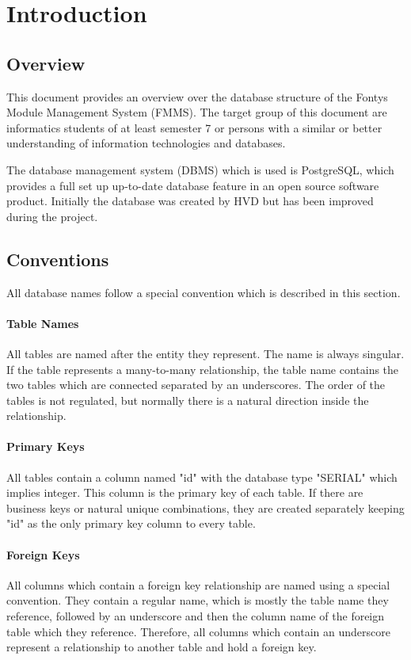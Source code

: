 \section{Introduction}
\label{sec:intro}


\subsection{Overview}

This document provides an overview over the database structure of the Fontys Module Management System (FMMS).
The target group of this document are informatics students of at least semester 7 or persons with a similar or better understanding of information technologies and databases.

The database management system (DBMS) which is used is PostgreSQL, which provides a full set up up-to-date database feature in an open source software product.
Initially the database was created by HVD but has been improved during the project.


\subsection{Conventions}

All database names follow a special convention which is described in this section.


\paragraph{Table Names}
All tables are named after the entity they represent. The name is always singular. If the table represents a many-to-many relationship, the table name contains the two tables which are connected separated by an underscores. The order of the tables is not regulated, but normally there is a natural direction inside the relationship.

\paragraph{Primary Keys}
All tables contain a column named "id" with the database type "SERIAL" which implies integer. This column is the primary key of each table. If there are business keys or natural unique combinations, they are created separately keeping "id" as the only primary key column to every table.

\paragraph{Foreign Keys}
All columns which contain a foreign key relationship are named using a special convention. They contain a regular name, which is mostly the table name they reference, followed by an underscore and then the column name of the foreign table which they reference. Therefore, all columns which contain an underscore represent a relationship to another table and hold a foreign key.

